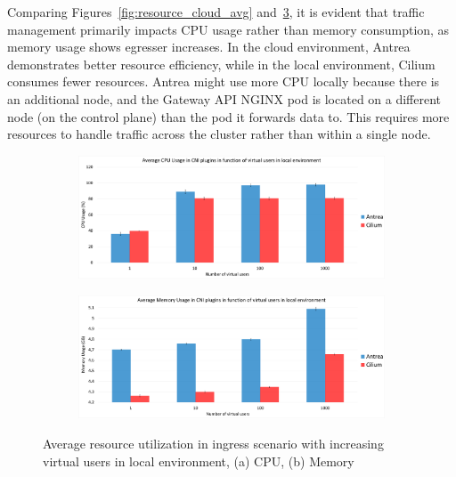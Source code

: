 Comparing Figures~\ref{fig:resource_cloud_avg} and~\ref{fig:resource_local_avg}, it is evident that traffic management primarily impacts CPU usage rather than memory consumption, as memory usage shows egresser increases. In the cloud environment, Antrea demonstrates better resource efficiency, while in the local environment, Cilium consumes fewer resources. Antrea might use more CPU locally because there is an additional node, and the Gateway API NGINX pod is located on a different node (on the control plane) than the pod it forwards data to. This requires more resources to handle traffic across the cluster rather than within a single node.

\begin{figure}[H]
    \centering
    \begin{subfigure}[b]{1\textwidth}
        \includegraphics[width=\textwidth]{plots/traffic-splitting/cpu_local.png}
        \caption{}
        \label{fig:cpu_local_avg}
    \end{subfigure}
    \begin{subfigure}[b]{1\textwidth}
        \includegraphics[width=\textwidth]{plots/traffic-splitting/memory_local.png}
        \caption{}
        \label{fig:memory_local_avg}
    \end{subfigure}
    
    \caption{Average resource utilization in ingress scenario with increasing virtual users in local environment, (a) CPU, (b) Memory}
    \label{fig:resource_local_avg}
\end{figure}

